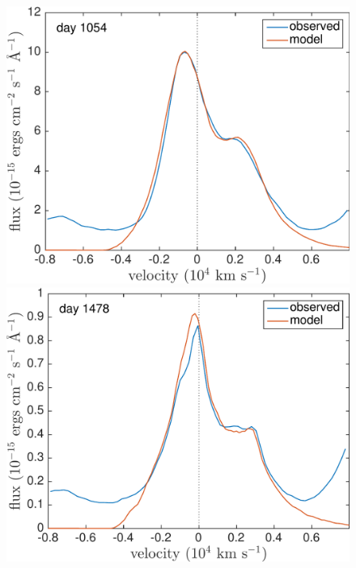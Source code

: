 \begin{figure}
\includegraphics[trim =0 25 0 0,clip=true,scale=0.4]{chapters/chapter5/images/clump_1/best_fit/d1054OI.pdf}
\hspace{1mm}
\includegraphics[trim =25 25 0 0,clip=true,scale=0.4]{chapters/chapter5/images/clump_1/best_fit/d1478OI.pdf}


\end{figure}
